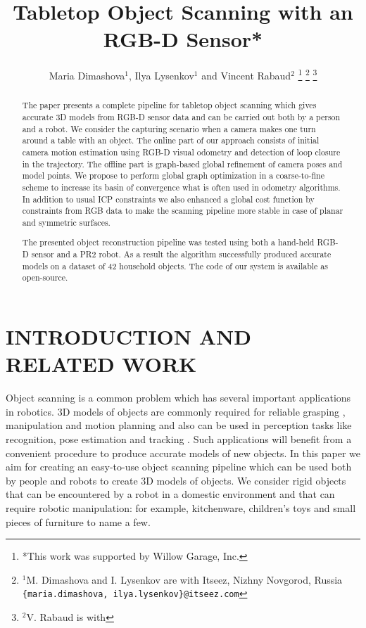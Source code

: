 \documentclass[letterpaper, 10 pt, conference]{ieeeconf}  %
\title{\LARGE \bf
Tabletop Object Scanning with an RGB-D Sensor*
}
\author{Maria Dimashova$^{1}$, Ilya Lysenkov$^{1}$ and  Vincent Rabaud$^{2}$
\thanks{*This work was supported by Willow Garage, Inc.}%
\thanks{$^{1}$M. Dimashova and I. Lysenkov are with Itseez, Nizhny Novgorod, Russia
        {\tt\small \{maria.dimashova, ilya.lysenkov\}@itseez.com}}%
\thanks{$^{2}$V. Rabaud is with {\tt\small }}%
}
\begin{document}
\maketitle
\thispagestyle{empty}
\pagestyle{empty}


\begin{abstract}
The paper presents a complete pipeline for tabletop object scanning
which gives accurate 3D models from RGB-D sensor data and can be carried out both by a person
and a robot. We consider the capturing scenario when a camera makes
one turn around a table with an object. The online part of our approach consists 
of initial camera motion estimation using RGB-D visual
odometry and detection of loop closure in the trajectory. The offline part
is graph-based global refinement of camera poses and model points.
We propose to perform global graph optimization in a coarse-to-fine scheme to 
increase its basin of convergence what is often used in odometry algorithms. 
In addition to usual ICP constraints we also enhanced a global cost function 
by constraints from RGB data to make the scanning pipeline more stable in case 
of planar and symmetric surfaces. 

The presented object reconstruction pipeline was tested using both a hand-held RGB-D sensor and a PR2 robot.
As a result the algorithm successfully produced accurate models on a dataset of 42 household objects.
The code of our system is available as open-source.

\end{abstract}


\section{INTRODUCTION AND RELATED WORK}

Object scanning is a common problem which has several important applications in robotics.
3D models of objects are commonly required for reliable grasping \cite{miller2004graspit, sahbani2012overview},
manipulation and motion planning and also can be used in perception tasks like recognition, pose estimation and tracking \cite{klank2009real, hinterstoisser2012accv}.
Such applications will benefit from a convenient procedure
to produce accurate models of new objects.
In this paper we aim for creating an easy-to-use object scanning pipeline
which can be used both by people and robots to create 3D models of objects.
We consider rigid objects that can be encountered
by a robot in a domestic environment and that can require robotic manipulation:
for example, kitchenware, children's toys and small pieces of furniture to name a few.
\end{document}
